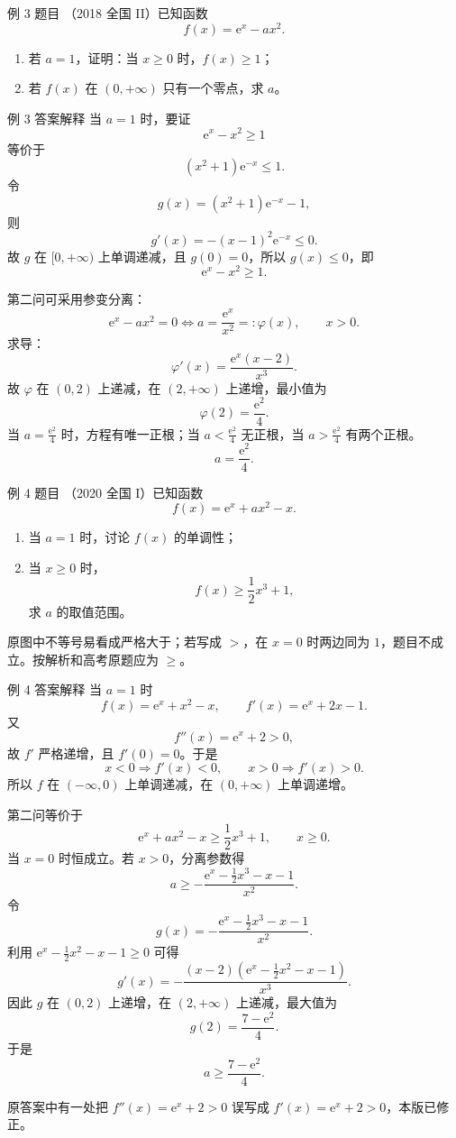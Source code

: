 ﻿\documentclass[aspectratio=169,10pt]{ctexbeamer}
\newcommand{\e}{\mathrm e}
\newcommand{\auditnote}[1]{\par\medskip{\color{Warn}\bfseries 原答案疏漏/补充：}#1}
\newcommand{\ocrnote}[1]{\par\medskip{\color{Warn}\bfseries 原文校验说明：}#1}
\begin{document}
\begin{frame}{例 3 题目}
\small
（2018 全国 II）已知函数
\[
f(x)=\e^x-ax^2.
\]
\begin{enumerate}
  \item 若 $a=1$，证明：当 $x\ge0$ 时，$f(x)\ge1$；
  \item 若 $f(x)$ 在 $(0,+\infty)$ 只有一个零点，求 $a$。
\end{enumerate}
\end{frame}

\begin{frame}[allowframebreaks]{例 3 答案解释}
\small
当 $a=1$ 时，要证
\[
\e^x-x^2\ge1
\]
等价于
\[
(x^2+1)\e^{-x}\le1.
\]
令
\[
g(x)=(x^2+1)\e^{-x}-1,
\]
则
\[
g'(x)=-(x-1)^2\e^{-x}\le0.
\]
故 $g$ 在 $[0,+\infty)$ 上单调递减，且 $g(0)=0$，所以 $g(x)\le0$，即
\[
\boxed{\e^x-x^2\ge1}.
\]

\framebreak

第二问可采用参变分离：
\[
\e^x-ax^2=0
\Longleftrightarrow
a=\frac{\e^x}{x^2}=:\varphi(x),\qquad x>0.
\]
求导：
\[
\varphi'(x)=\frac{\e^x(x-2)}{x^3}.
\]
故 $\varphi$ 在 $(0,2)$ 上递减，在 $(2,+\infty)$ 上递增，最小值为
\[
\varphi(2)=\frac{\e^2}{4}.
\]
当 $a=\frac{\e^2}{4}$ 时，方程有唯一正根；当 $a<\frac{\e^2}{4}$ 无正根，当 $a>\frac{\e^2}{4}$ 有两个正根。
\[
\boxed{a=\frac{\e^2}{4}}.
\]
\end{frame}

\begin{frame}{例 4 题目}
\small
（2020 全国 I）已知函数
\[
f(x)=\e^x+ax^2-x.
\]
\begin{enumerate}
  \item 当 $a=1$ 时，讨论 $f(x)$ 的单调性；
  \item 当 $x\ge0$ 时，
  \[
  f(x)\ge\frac12x^3+1,
  \]
  求 $a$ 的取值范围。
\end{enumerate}
\ocrnote{原图中不等号易看成严格大于；若写成 $>$，在 $x=0$ 时两边同为 $1$，题目不成立。按解析和高考原题应为 $\ge$。}
\end{frame}

\begin{frame}[allowframebreaks]{例 4 答案解释}
\small
当 $a=1$ 时
\[
f(x)=\e^x+x^2-x,\qquad f'(x)=\e^x+2x-1.
\]
又
\[
f''(x)=\e^x+2>0,
\]
故 $f'$ 严格递增，且 $f'(0)=0$。于是
\[
x<0\Rightarrow f'(x)<0,\qquad x>0\Rightarrow f'(x)>0.
\]
所以 $f$ 在 $(-\infty,0)$ 上单调递减，在 $(0,+\infty)$ 上单调递增。

\framebreak

第二问等价于
\[
\e^x+ax^2-x\ge\frac12x^3+1,\qquad x\ge0.
\]
当 $x=0$ 时恒成立。若 $x>0$，分离参数得
\[
a\ge-\frac{\e^x-\frac12x^3-x-1}{x^2}.
\]
令
\[
g(x)=-\frac{\e^x-\frac12x^3-x-1}{x^2}.
\]
利用 $\e^x-\frac12x^2-x-1\ge0$ 可得
\[
g'(x)=-\frac{(x-2)\left(\e^x-\frac12x^2-x-1\right)}{x^3}.
\]
因此 $g$ 在 $(0,2)$ 上递增，在 $(2,+\infty)$ 上递减，最大值为
\[
g(2)=\frac{7-\e^2}{4}.
\]
于是
\[
\boxed{a\ge\frac{7-\e^2}{4}}.
\]
\auditnote{原答案中有一处把 $f''(x)=\e^x+2>0$ 误写成 $f'(x)=\e^x+2>0$，本版已修正。}
\end{frame}
\end{document}

